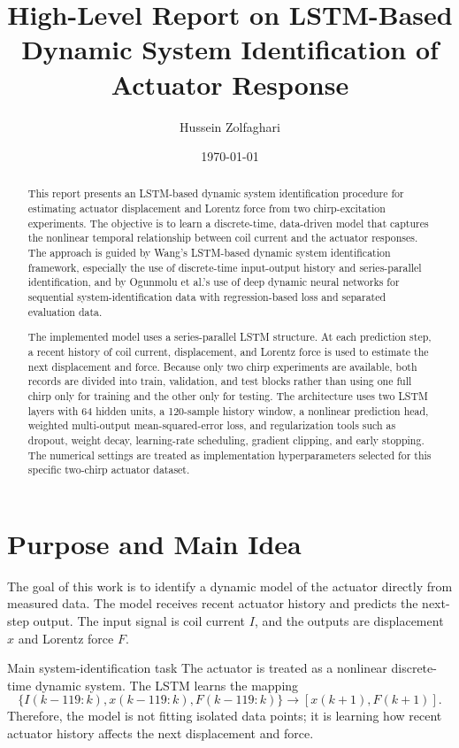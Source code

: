 \documentclass[11pt]{article}
\title{High-Level Report on LSTM-Based Dynamic System Identification of Actuator Response}
\author{Hussein Zolfaghari}
\date{\today}
\begin{document}
\maketitle

\begin{abstract}
This report presents an LSTM-based dynamic system identification procedure for estimating actuator displacement and Lorentz force from two chirp-excitation experiments. The objective is to learn a discrete-time, data-driven model that captures the nonlinear temporal relationship between coil current and the actuator responses. The approach is guided by Wang's LSTM-based dynamic system identification framework, especially the use of discrete-time input-output history and series-parallel identification, and by Ogunmolu et al.'s use of deep dynamic neural networks for sequential system-identification data with regression-based loss and separated evaluation data.

The implemented model uses a series-parallel LSTM structure. At each prediction step, a recent history of coil current, displacement, and Lorentz force is used to estimate the next displacement and force. Because only two chirp experiments are available, both records are divided into train, validation, and test blocks rather than using one full chirp only for training and the other only for testing. The architecture uses two LSTM layers with 64 hidden units, a 120-sample history window, a nonlinear prediction head, weighted multi-output mean-squared-error loss, and regularization tools such as dropout, weight decay, learning-rate scheduling, gradient clipping, and early stopping. The numerical settings are treated as implementation hyperparameters selected for this specific two-chirp actuator dataset.
\end{abstract}

\section{Purpose and Main Idea}
The goal of this work is to identify a dynamic model of the actuator directly from measured data. The model receives recent actuator history and predicts the next-step output. The input signal is coil current $I$, and the outputs are displacement $x$ and Lorentz force $F$.

\begin{summarybox}{Main system-identification task}
The actuator is treated as a nonlinear discrete-time dynamic system. The LSTM learns the mapping
\begin{equation}
\{I(k-119:k),x(k-119:k),F(k-119:k)\}\rightarrow [x(k+1),F(k+1)].
\end{equation}
Therefore, the model is not fitting isolated data points; it is learning how recent actuator history affects the next displacement and force.
\end{summarybox}
\end{document}
